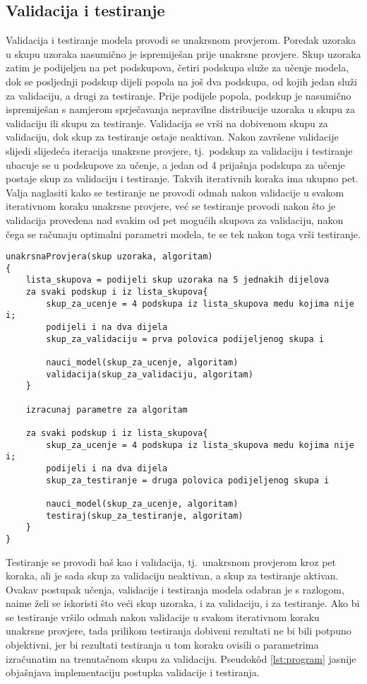 \documentclass[10pt, a4paper]{article}
\begin{document}
\subsection{Validacija i testiranje}
Validacija i testiranje modela provodi se unakrsnom provjerom.
Poredak uzoraka u skupu uzoraka nasumično je ispremiješan prije
unakrsne provjere.
Skup uzoraka zatim je podijeljen na pet podskupova, četiri podskupa
služe za učenje modela, dok se posljednji podskup dijeli popola
na još dva podskupa, od kojih jedan služi za validaciju, a drugi za testiranje.
Prije podijele popola, podskup je nasumično ispremiješan s
namjerom sprječavanja nepravilne distribucije uzoraka u skupu za validaciju
ili skupu za testiranje. Validacija se vrši na dobivenom skupu za validaciju, 
dok skup za testiranje ostaje neaktivan. Nakon završene validacije
slijedi slijedeća iteracija unakrsne provjere, tj.~podskup za validaciju
i testiranje ubacuje se u podskupove za učenje, a jedan od 4 prijašnja podskupa
za učenje postaje skup za validaciju i testiranje. Takvih iterativnih koraka ima ukupno
pet. Valja naglasiti kako se testiranje ne provodi odmah nakon validacije u svakom
iterativnom koraku unakrsne provjere, već se testiranje provodi nakon što je validacija
provedena nad svakim od pet mogućih skupova za validaciju, nakon čega se računaju
optimalni parametri modela, te se tek nakon toga vrši testiranje. 

\begin{lstlisting}[label=lst:program,caption= Pseudok\^od implementiranog postupka validacije i testiranja unakrsnom provjerom.]
unakrsnaProvjera(skup uzoraka, algoritam)
{
	lista_skupova = podijeli skup uzoraka na 5 jednakih dijelova
	za svaki podskup i iz lista_skupova{
		skup_za_ucenje = 4 podskupa iz lista_skupova medu kojima nije i;
		podijeli i na dva dijela
		skup_za_validaciju = prva polovica podijeljenog skupa i
		
		nauci_model(skup_za_ucenje, algoritam)
		validacija(skup_za_validaciju, algoritam)
	}
		
	izracunaj parametre za algoritam
	
	za svaki podskup i iz lista_skupova{
		skup_za_ucenje = 4 podskupa iz lista_skupova medu kojima nije i;
		podijeli i na dva dijela
		skup_za_testiranje = druga polovica podijeljenog skupa i
		
		nauci_model(skup_za_ucenje, algoritam)
		testiraj(skup_za_testiranje, algoritam)
	} 	
}
\end{lstlisting}


Testiranje se provodi baš kao i validacija, tj.~unakrsnom provjerom kroz pet koraka, 
ali je sada skup za validaciju neaktivan, a skup za testiranje aktivan.
Ovakav postupak učenja, validacije i testiranja modela odabran je s razlogom, naime
želi se iskoristi što veći skup uzoraka, i za validaciju, i za testiranje.
Ako bi se testiranje vršilo odmah nakon validacije u svakom iterativnom
koraku unakrsne provjere, tada prilikom testiranja dobiveni rezultati ne bi bili
potpuno objektivni, jer bi rezultati testiranja u tom koraku ovisili
o parametrima izračunatim na trenutačnom skupu za validaciju. Pseudok\^od \ref{lst:program}
jasnije objašnjava implementaciju postupka validacije i testiranja.
\end{document}
